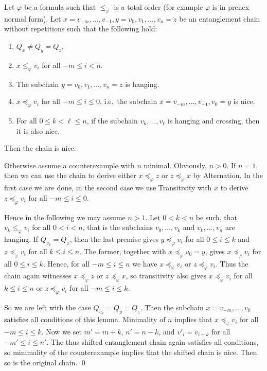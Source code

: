 \documentclass{LMCS}
\renewcommand{\phi}{\varphi}
\newcommand{\trans}{Transitivity}
\newcommand{\alt}{Alternation}
\begin{document}
\begin{lem}\label{lem:bloedes zeug 1}
Let $\phi$ be a formula such that $\leq_{\phi}$ is a total order 
(for example $\phi$ is in prenex normal form). 
Let $x=v_{-m},\ldots,v_{-1},y=v_0,v_1,\ldots,v_n=z$ 
be an entanglement chain without repetitions 
such that the following hold: 
\begin{enumerate}[\em(1)]
\item $Q_x\not=Q_y=Q_z$. 
\item $x\leq_{\phi}v_i$ for all $-m\leq i<n$. 
\item The subchain $y=v_0,v_1,\ldots,v_n=z$ is hanging. 
\item $x\preceq_{\phi}v_i$ for all $-m\leq i\leq 0$, 
  i.e.~the subchain $x=v_{-m},\ldots,v_{-1},v_0=y$ is nice. 
\item For all $0\leq k<\ell\leq n$, 
  if the subchain $v_k,\ldots,v_{\ell}$ is hanging and crossing, 
  then it is also nice. 
\end{enumerate}
Then the chain is nice. 
\end{lem}

\proof
Otherwise assume a counterexample with $n$ minimal. 
Obviously, $n>0$. 
If $n=1$, then we can use the chain 
to derive either $x\preceq_{\phi}z$ or $z\preceq_{\phi}x$ by \alt. 
In the first case we are done, 
in the second case we use \trans{} with $x$ 
to derive $z\preceq_{\phi}v_i$ for all $-m\leq i\leq 0$. 

Hence in the following we may assume $n>1$. 
Let $0<k<n$ be such, that $v_k\leq_{\phi}v_i$ for all $0<i<n$, 
that is the subchains $v_0,\ldots,v_k$ and $v_k,\ldots,v_n$ are hanging. 
If $Q_{v_k}=Q_x$, then the last premise 
gives $y\preceq_{\phi}v_i$ for all $0\leq i\leq k$ 
and $z\preceq_{\phi}v_i$ for all $k\leq i\leq n$. 
The former, together with $x\preceq_{\phi}v_0=y$, 
gives $x\preceq_{\phi}v_i$ for all $0\leq i\leq k$. 
Hence, for all $-m\leq i\leq n$ 
we have $x\preceq_{\phi}v_i$ or $z\preceq_{\phi}v_i$. 
Thus the chain again witnesses $x\preceq_{\phi}z$ or $z\preceq_{\phi}x$, 
so transitivity also gives $x\preceq_{\phi}v_i$ for all $k\leq i\leq n$ 
or $z\preceq_{\phi}v_i$ for all $-m\leq i\leq k$. 

So we are left with the case $Q_{v_k}=Q_y=Q_z$. 
Then the subchain $x=v_{-m},\ldots,v_k$ 
satisfies all conditions of this lemma. 
Minimality of $n$ implies that $x\preceq_{\phi}v_i$ for all $-m\leq i\leq k$. 
Now we set $m'=m+k$, $n'=n-k$, and $v'_i=v_{i+k}$ for all $-m'\leq i\leq n'$. 
The thus shifted entanglement chain again satisfies all conditions, 
so minimality of the counterexample implies 
that the shifted chain is nice. 
Then so is the original chain. 
\qed
\end{document}
